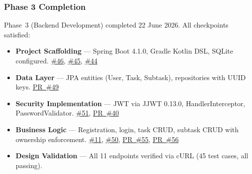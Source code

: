 \subsubsection{Phase 3 Completion}
Phase~3 (Backend Development) completed 22 June 2026. All checkpoints satisfied:
\begin{itemize}
  \item \textbf{Project Scaffolding} --- Spring Boot 4.1.0, Gradle Kotlin DSL, SQLite configured.
    \href{https://github.com/JaehoonSong12/PEP-Team02-TheDJs/issues/46}{\#46},
    \href{https://github.com/JaehoonSong12/PEP-Team02-TheDJs/issues/45}{\#45},
    \href{https://github.com/JaehoonSong12/PEP-Team02-TheDJs/issues/44}{\#44}
  \item \textbf{Data Layer} --- JPA entities (User, Task, Subtask), repositories with UUID keys.
    \href{https://github.com/JaehoonSong12/PEP-Team02-TheDJs/pull/49}{PR~\#49}
  \item \textbf{Security Implementation} --- JWT via JJWT 0.13.0, HandlerInterceptor, PasswordValidator.
    \href{https://github.com/JaehoonSong12/PEP-Team02-TheDJs/issues/51}{\#51},
    \href{https://github.com/JaehoonSong12/PEP-Team02-TheDJs/pull/40}{PR~\#40}
  \item \textbf{Business Logic} --- Registration, login, task CRUD, subtask CRUD with ownership enforcement.
    \href{https://github.com/JaehoonSong12/PEP-Team02-TheDJs/issues/11}{\#11},
    \href{https://github.com/JaehoonSong12/PEP-Team02-TheDJs/issues/50}{\#50},
    \href{https://github.com/JaehoonSong12/PEP-Team02-TheDJs/pull/55}{PR~\#55},
    \href{https://github.com/JaehoonSong12/PEP-Team02-TheDJs/pull/56}{PR~\#56}
  \item \textbf{Design Validation} --- All 11 endpoints verified via cURL (45 test cases, all passing).
\end{itemize}

